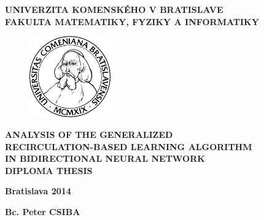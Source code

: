 \begin{center}
    \large{
        \textbf{
            UNIVERZITA KOMENSKÉHO V BRATISLAVE \\ 
            FAKULTA MATEMATIKY, FYZIKY A INFORMATIKY
        }
    }
\end{center}

\vspace{2cm}

\begin{figure}[!h]
    \centering
    \includegraphics[width=3.5cm]{img/komlogo-new}
\end{figure}

\vspace{1cm}

\begin{center}
    \large{
        \textbf{
            ANALYSIS OF THE GENERALIZED \\
            RECIRCULATION-BASED LEARNING ALGORITHM \\
            IN BIDIRECTIONAL NEURAL NETWORK \\
            \vspace{3cm}
            DIPLOMA THESIS
        }
    }
\end{center}

\vfill

\begin{multicols}{2}
    \begin{flushleft}
        \textbf{Bratislava 2014}
    \end{flushleft}
    \begin{flushright}
        \textbf{Bc. Peter CSIBA}
    \end{flushright}
\end{multicols}
